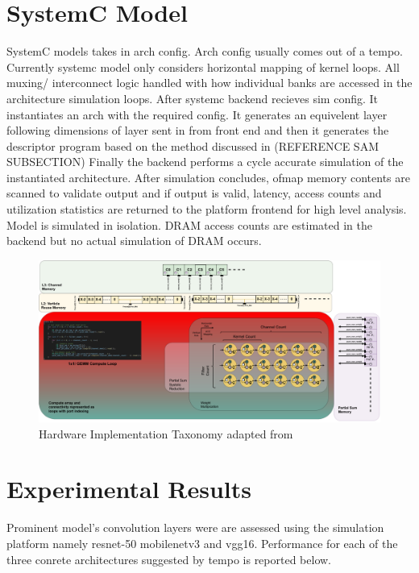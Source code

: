 \section{SystemC Model}
\label{chap:hero:sim_platform:sysc_side}

SystemC models takes in arch config. Arch config usually comes out of a tempo.
Currently systemc model only considers horizontal mapping of kernel loops. All
muxing/ interconnect logic handled with how individual banks are accessed in the
architecture simulation loops. After systemc backend recieves sim config. It
instantiates an arch with the required config. It generates an equivelent layer
following dimensions of layer sent in from front end and then it generates the
descriptor program based on the method discussed in (REFERENCE SAM SUBSECTION)
Finally the backend performs a cycle accurate simulation of the instantiated
architecture. After simulation concludes, ofmap memory contents are scanned to
validate output and if output is valid, latency, access counts and utilization
statistics are returned to the platform frontend for high level analysis. Model
is simulated in isolation. DRAM access counts are estimated in the backend but
no actual simulation of DRAM occurs.

\begin{figure}[ht]
    \centering
    \includegraphics[scale=0.58]{fig/hero-t-sysc.pdf}
    \caption{Hardware Implementation Taxonomy adapted from \cite{maestro}}
    \label{fig:hw_taxonomy}
\end{figure}


\section{Experimental Results}
\label{chap:hero:sim_platform:cigar_side}

Prominent model's convolution layers were are assessed using the simulation platform  
namely resnet-50 mobilenetv3 and vgg16. Performance for each of the three conrete
architectures suggested by tempo is reported below.




